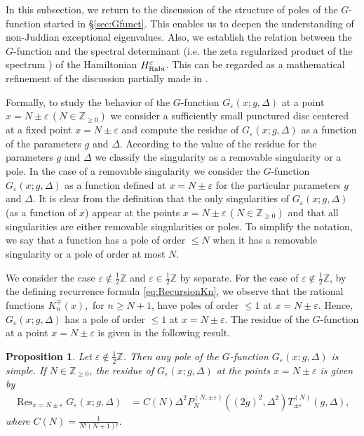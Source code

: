 \documentclass[11pt]{article}
\numberwithin{equation}{section}
\newcommand{\Z}{\mathbb{Z}} %
\newcommand{\e}{\varepsilon}
\newcommand{\HRabi}[1]{H_{\text{\upshape Rabi}}^{#1}} %
\newcommand{\cp}[2]{P^{(#1)}_{#2}} %
\DeclareMathOperator*{\Res}{Res} %
\theoremstyle{plain}
\newtheorem{prop}[thm]{Proposition}
\theoremstyle{definition}
\theoremstyle{remark}
\begin{document}
In this subsection, we return to the discussion of the structure of poles of the $G$-function
started in \S \ref{sec:Gfunct}. This enables us to deepen the understanding of non-Juddian exceptional eigenvalues.
Also, we establish the relation between the $G$-function and the spectral determinant (i.e. the zeta regularized product  of the spectrum \cite{V1987CMP,QHS1993TAMS}) of the Hamiltonian $\HRabi{\e}$. This can be regarded as a mathematical refinement of the discussion partially made in \cite{LB2016JPA}.


Formally, to study the behavior of the $G$-function $G_\e(x;g,\Delta)$ at a point \(x = N \pm \e \, (N \in \Z_{\ge 0})\) we consider a sufficiently small
punctured disc centered at a fixed point \(x = N \pm \e \) and compute the residue of $G_\e(x;g,\Delta)$ as a function of the parameters \(g\) and
\(\Delta\). According to the value of the residue for the parameters \(g\) and  \(\Delta\) we classify the singularity as a removable singularity or a
pole. In the case of a removable singularity we consider the $G$-function $G_\e(x;g,\Delta)$ as a function defined at \(x = N \pm \e \) for the
particular parameters \(g\) and \(\Delta\). It is clear from the definition that the only singularities of $G_\e(x;g,\Delta)$ (as a function of \(x\))
appear at the points \(x = N \pm \e  \, (N \in \Z_{\geq 0})\) and that all singularities are either removable singularities or poles.
To simplify the notation, we say that a function has a pole of order \(\leq N\) when it has a removable singularity or a pole of order at most \(N\).

We consider the case \(\e \not\in \frac12 \Z \) and \(\e \in \frac12 \Z \) by separate. For the case of \(\e \not\in \frac12 \Z \), by the defining
recurrence formula \eqref{eq:RecursionKn}, we observe that the rational functions $K^{\mp}_n(x),$ for $ n\geq N+1$, have poles of order \(\leq 1\) at
$x=N\pm \e$. Hence, $G_\e(x;g,\Delta)$ has a pole of order \(\leq 1\) at $x=N\pm \e$. The residue of the $G$-function at a point \(x = N \pm \e \) is
given in the following result.

\begin{prop}\label{prop:polenhi1}
  Let \(\e \not\in \frac12 \Z \). Then any pole of the $G$-function $G_\e(x;g,\Delta)$ is simple.
  If \(N \in \Z_{\geq 0}\), the residue of $G_\e(x;g,\Delta)$ at the points \(x = N \pm \e \) is given by
  \begin{align*}
    \Res_{x = N \pm \e} G_\e(x;g,\Delta) &= C(N) \Delta^2 \cp{N,\pm \e}{N}((2g)^2,\Delta^2) T^{(N)}_{\pm \e} (g,\Delta),
  \end{align*}
  where \(C(N) = \frac{1}{N! (N+1)!} \).
\end{prop}
\end{document}
